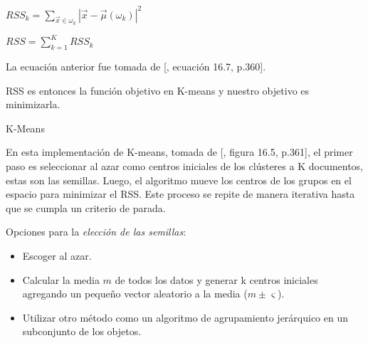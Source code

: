 \documentclass{llncs}
\DeclareMathOperator*{\argmin}{arg\,min}
\begin{document}
	\begin{center}
		$ RSS_{k} = \sum_{\overrightarrow{x} \in \omega_{k}}|\overrightarrow{x} - \overrightarrow{\mu}(\omega_{k})|^2$
	
	\vspace{1em}
	$ RSS = \sum_{k=1}^{K} RSS_{k} $
	\end{center}
	
	La ecuaci\'on anterior fue tomada de [\cite{B1}, ecuaci\'on 16.7, p.360].
	
	RSS es entonces la función objetivo en K-means y nuestro objetivo es minimizarla.
	
	\begin{algorithm}
		\caption{K-Means} 
		\begin{algorithmic}[1]
			\EndFor
				\EndFor
				\State{$ j \leftarrow \argmin_{j'}|\overrightarrow{\mu_{j'}}-\overrightarrow{x_{n}}| $}
				\EndFor
				\EndFor
			\EndWhile
		\end{algorithmic}
	\end{algorithm}

En esta implementaci\'on de K-means, tomada de [\cite{B1}, figura 16.5, p.361], el primer paso es seleccionar al azar como centros iniciales de los cl\'usteres a K documentos, estas son las semillas. Luego, el algoritmo mueve los centros de los grupos en el espacio para minimizar el RSS. Este proceso se repite de manera iterativa hasta que se cumpla un criterio de parada.

\vspace{0.5em}
Opciones para la \textit{elecci\'on de las semillas}:
\begin{itemize}
	\item Escoger al azar.
	\item Calcular la media $ m $ de todos los datos y generar k centros iniciales agregando un pequeño vector aleatorio a la media ($ m \pm \varsigma $).
	\item Utilizar otro método como un algoritmo de agrupamiento jerárquico en un subconjunto de los objetos.
\end{itemize}
\end{document}
